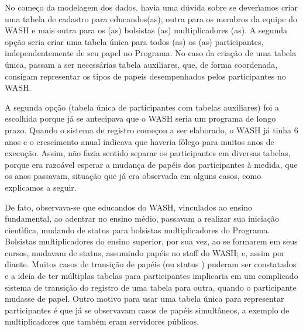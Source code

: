 \documentclass[
12pt,		%
openright,	%
twoside,  %
a4paper,			%
chapter=TITLE,		%
english,			%
french,				%
spanish,			%
brazil				%
]{USPSC-classe/USPSC}
\begin{document}
No come\c{c}o da modelagem dos dados, havia uma d\'uvida sobre se dever\'{\i}amos criar uma tabela de cadastro para educandos(as), outra para os membros da equipe do WASH e mais outra para os (as) bolsistas (as) multiplicadores (as). A segunda op\c{c}\~ao seria criar uma tabela \'unica para todos (as) os (as) participantes, independentemente de seu papel no Programa. No caso da cria\c{c}\~ao de uma tabela \'unica, passam a ser necess\'arias tabela auxiliares, que, de forma coordenada, consigam representar os \textquotedbl tipos de papeis \textquotedbl   desempenhados pelos participantes no WASH.









A segunda op\c{c}\~ao (tabela \'unica de participantes com tabelas auxiliares) foi a escolhida porque j\'a se antecipava que o WASH seria um programa de longo prazo. Quando o sistema de registro come\c{c}ou a ser elaborado, o WASH j\'a tinha 6 anos e o crescimento anual indicava que haveria f\^olego para muitos anos de execu\c{c}\~ao. Assim, n\~ao fazia sentido separar os participantes em diversas tabelas, porque era razo\'avel esperar a mudan\c{c}a de pap\'eis dos participantes \`a medida, que os anos passavam, situa\c{c}\~ao que j\'a era observada em alguns casos, como explicamos a seguir.









De fato, observava-se que educandos do WASH, vinculados ao ensino fundamental, ao adentrar no ensino m\'edio, passavam a realizar sua inicia\c{c}\~ao cient\'{\i}fica, mudando de status para bolsistas multiplicadores do Programa. Bolsistas multiplicadores do ensino superior, por sua vez, ao se formarem em seus cursos, mudavam de status, assumindo pap\'eis no  \textquotedbl staff \textquotedbl  do WASH; e, assim por diante. Muitos casos de transi\c{c}\~ao de pap\'eis (ou \textquotedbl status \textquotedbl ) puderam ser constatados e a ideia de ter m\'ultiplas tabelas para participantes implicaria em um complicado sistema de transi\c{c}\~ao do registro de uma tabela para outra, quando o participante mudasse de papel. Outro motivo para usar uma tabela \'unica para representar participantes \'e que j\'a se observavam casos de pap\'eis simult\^aneos, a exemplo de multiplicadores que tamb\'em eram servidores p\'ublicos.
\end{document}
